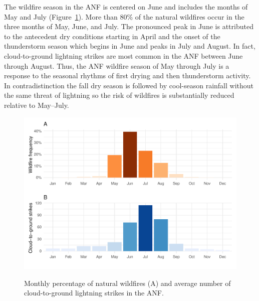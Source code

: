 \documentclass[12pt]{iopart}
\begin{document}
The wildfire season in the ANF is centered on June and includes the months of May and July (Figure~\ref{MonthlyFiresLightning}). More than 80\% of the natural wildfires occur in the three months of May, June, and July. The pronounced peak in June is attributed to the antecedent dry conditions starting in April and the onset of the thunderstorm season which begins in June and peaks in July and August. In fact, cloud-to-ground lightning strikes are most common in the ANF between June through August. Thus, the ANF wildfire season of May through July is a response to the seasonal rhythms of first drying and then thunderstorm activity. In contradistinction the fall dry season is followed by cool-season rainfall without the same threat of lightning so the risk of wildfires is substantially reduced relative to May--July.
\begin{figure}[t]
\noindent\includegraphics[scale=.8,trim=0in 0in 0in 0in,clip]{MonthlyFiresLightning.pdf}\\
\vspace{-.5in}
\caption{Monthly percentage of natural wildfires (A) and average number of cloud-to-ground lightning strikes in the ANF.}
\label{MonthlyFiresLightning}
\end{figure}
\end{document}
